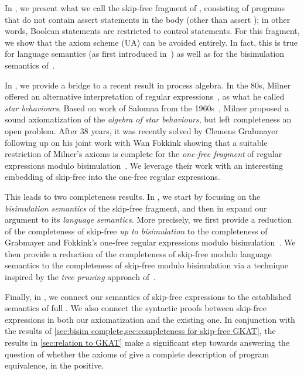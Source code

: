 \documentclass[orivec,envcountsect,envcountsame]{llncs}
\begin{document}
   In , we present what we call the skip-free fragment of \GKAT, consisting of programs that do not contain {\sffamily assert} statements in the body (other than {\sffamily assert }); in other words, Boolean statements are restricted to control statements.
   For this fragment, we show that the axiom scheme (\textsf{UA}) can be avoided entirely. In fact, this is true for language semantics (as first introduced in~\cite{gkatpopl}) as well as for the bisimulation semantics of~\cite{gkaticalp}.

    In , we provide a bridge to a recent result in process algebra.
    In the 80s, Milner offered an alternative interpretation of regular expressions~\cite{milner}, as what he called \emph{star behaviours}.
    Based on work of Salomaa from the 1960s~\cite{salomaa}, Milner proposed a sound axiomatization of the \emph{algebra of star behaviours}, but left completeness an open problem.
    After 38 years, it was recently solved by Clemens Grabmayer~\cite{regexlics} following up on his joint work with Wan Fokkink showing that a suitable restriction of Milner's axioms is complete for the \emph{one-free fragment} of regular expressions modulo bisimulation~\cite{onefreeregexlics}.
    We leverage their work with an interesting embedding of skip-free \GKAT into the one-free regular expressions.

    This leads to two completeness results.
    In , we start by focusing on the \emph{bisimulation semantics} of the skip-free fragment, and then in  expand our argument to its \emph{language semantics}.  More precisely, we first provide a reduction of the completeness of skip-free \GKAT \emph{up to bisimulation} to the completeness of Grabmayer and Fokkink's one-free regular expressions modulo bisimulation~\cite{onefreeregexlics}.
    We then provide a reduction of the completeness of skip-free  \GKAT modulo language semantics to the completeness of skip-free  \GKAT modulo bisimulation via a technique inspired by the \emph{tree pruning} approach of~\cite{gkaticalp}.

    Finally, in , we connect our semantics of skip-free \GKAT expressions to the established semantics of full \GKAT. %
    We also connect the syntactic proofs between skip-free \GKAT expressions in both our axiomatization and the existing one.
    In conjunction with the results of \cref{sec:bisim complete,sec:completeness for skip-free GKAT}, the results in \cref{sec:relation to GKAT} make a significant step towards answering the question of whether the axioms of \GKAT give a complete description of program equivalence, in the positive.
\end{document}
